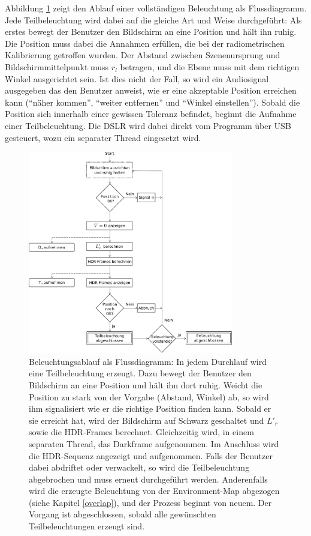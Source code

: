    Abbildung \ref{fig:ablauf} zeigt den Ablauf einer vollständigen Beleuchtung als Flussdiagramm.
   Jede Teilbeleuchtung wird dabei auf die gleiche Art und Weise durchgeführt: 
   Als erstes bewegt der Benutzer den Bildschirm an eine Position und hält ihn ruhig.
   Die Position muss dabei die Annahmen erfüllen, die bei der radiometrischen Kalibrierung getroffen wurden.
   Der Abstand zwischen Szenenursprung und Bildschirmmittelpunkt muss $r_l$ betragen, und die Ebene muss mit dem richtigen Winkel ausgerichtet sein. 
   Ist dies nicht der Fall, so wird ein Audiosignal ausgegeben das den Benutzer anweist, wie er eine akzeptable Position erreichen kann (``näher kommen'', ``weiter entfernen'' und  ``Winkel einstellen'').
   Sobald die Position sich innerhalb einer gewissen Toleranz befindet, beginnt die Aufnahme einer Teilbeleuchtung.
   Die DSLR wird dabei direkt vom Programm über USB gesteuert, wozu ein separater Thread eingesetzt wird.
  
  \begin{figure}[H]
    \centering
    \includegraphics[width=0.8\textwidth]{../graphics/beleuchtung/ablauf.svg}
    \caption[Flussdiagramm: Beleuchtungsablauf]{Beleuchtungsablauf als Flussdiagramm: In jedem Durchlauf wird eine Teilbeleuchtung erzeugt. Dazu bewegt der Benutzer den Bildschirm an eine Position und hält ihn dort ruhig. Weicht die Position zu stark von der Vorgabe (Abstand, Winkel) ab, so wird ihm signalisiert wie er die richtige Position finden kann. Sobald er sie erreicht hat, wird der Bildschirm auf Schwarz geschaltet und  $L'_r$ sowie die HDR-Frames berechnet. 
    Gleichzeitig wird, in einem separaten Thread, das Darkframe aufgenommen.
    Im Anschluss wird die HDR-Sequenz angezeigt und aufgenommen.
    Falls der Benutzer dabei abdriftet oder verwackelt, so wird die Teilbeleuchtung abgebrochen und muss erneut durchgeführt werden.
    Anderenfalls wird die erzeugte Beleuchtung von der Environment-Map abgezogen (siehe Kapitel \ref{overlap}), und der Prozess beginnt von neuem.
    Der Vorgang ist abgeschlossen, sobald alle gewünschten Teilbeleuchtungen erzeugt sind.}
    \label{fig:ablauf}
   \end{figure}
   
